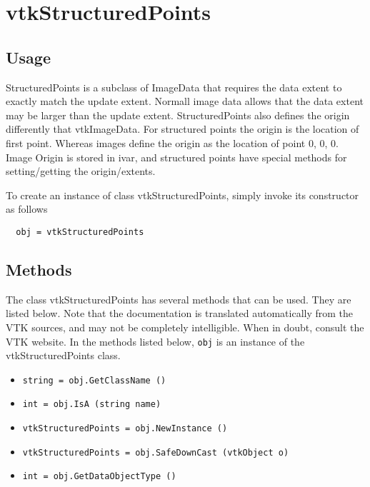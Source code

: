 \section{vtkStructuredPoints}

\subsection{Usage}

 StructuredPoints is a subclass of ImageData that requires the data extent
 to exactly match the update extent. Normall image data allows that the
 data extent may be larger than the update extent.
 StructuredPoints also defines the origin differently that vtkImageData.
 For structured points the origin is the location of first point. 
 Whereas images define the origin as the location of point 0, 0, 0.
 Image Origin is stored in ivar, and structured points
 have special methods for setting/getting the origin/extents.

To create an instance of class vtkStructuredPoints, simply
invoke its constructor as follows
\begin{verbatim}
  obj = vtkStructuredPoints
\end{verbatim}
\subsection{Methods}

The class vtkStructuredPoints has several methods that can be used.
  They are listed below.
Note that the documentation is translated automatically from the VTK sources,
and may not be completely intelligible.  When in doubt, consult the VTK website.
In the methods listed below, \verb|obj| is an instance of the vtkStructuredPoints class.
\begin{itemize}
\item  \verb|string = obj.GetClassName ()|

\item  \verb|int = obj.IsA (string name)|

\item  \verb|vtkStructuredPoints = obj.NewInstance ()|

\item  \verb|vtkStructuredPoints = obj.SafeDownCast (vtkObject o)|

\item  \verb|int = obj.GetDataObjectType ()|

\end{itemize}
